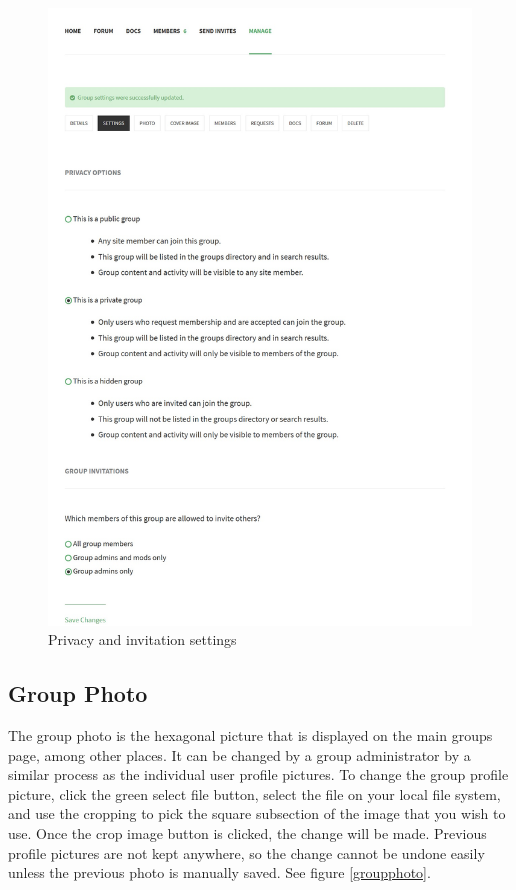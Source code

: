 \documentclass[10pt]{article}
\begin{document}
\begin{figure}[H]
    \centering
    \includegraphics[scale=0.33]{images/groupsettings.jpg}
    \caption{Privacy and invitation settings}
    \label{groupsettings}
\end{figure}

\subsection{Group Photo}

\begin{flushleft}
The group photo is the hexagonal picture that is displayed on the main groups page, among other places.  It can be changed by a group administrator by a similar process as the individual user profile pictures.  To change the group profile picture, click the green select file button, select the file on your local file system, and use the cropping to pick the square subsection of the image that you wish to use.  Once the crop image button is clicked, the change will be made.  Previous profile pictures are not kept anywhere, so the change cannot be undone easily unless the previous photo is manually saved.  See figure \ref{groupphoto}.
\end{flushleft}
\end{document}
